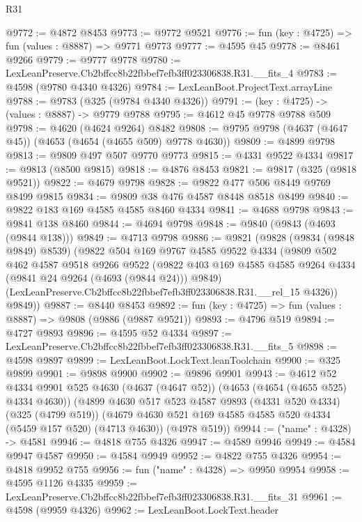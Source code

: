 \begin{lexlean}{R31}
\begin{coremodule}
@9772 := @4872 @8453
@9773 := @9772 @9521
@9776 := fun (key : @4725) => fun (values : @8887) => @9771 @9773
@9777 := @4595 @45
@9778 := @8461 @9266
@9779 := @9777 @9778
@9780 := LexLeanPreserve.Cb2bffcc8b22fbbef7efb3ff023306838.R31.__fits_4
@9783 := @4598 (@9780 @4340 @4326)
@9784 := LexLeanBoot.ProjectText.arrayLine
@9788 := @9783 (@325 (@9784 @4340 @4326))
@9791 := (key : @4725) -> (values : @8887) -> @9779 @9788
@9795 := @4612 @45 @9778 @9788 @509
@9798 := @4620 (@4624 @9264) @8482
@9808 := @9795 @9798 (@4637 (@4647 @45)) (@4653 (@4654 (@4655 @509) @9778 @4630))
@9809 := @4899 @9798
@9813 := @9809 @497 @507 @9770 @9773
@9815 := @4331 @9522 @4334
@9817 := @9813 (@8500 @9815)
@9818 := @4876 @8453
@9821 := @9817 (@325 (@9818 @9521))
@9822 := @4679 @9798
@9828 := @9822 @477 @506 @8449 @9769 @8499 @9815
@9834 := @9809 @38 @476 @4587 @8448 @8518 @8499
@9840 := @9822 @183 @169 @4585 @4585 @8460 @4334
@9841 := @4688 @9798
@9843 := @9841 @138 @8460
@9844 := @4694 @9798
@9848 := @9840 (@9843 (@4693 (@9844 @138)))
@9849 := @4713 @9798
@9886 := @9821
    (@9828
      (@9834 (@9848 @9849) @8539)
      (@9822
        @504
        @169
        @9767
        @4585
        @9522
        @4334
        (@9809
          @502
          @462
          @4587
          @9518
          @9266
          @9522
          (@9822 @403 @169 @4585 @4585 @9264 @4334 (@9841 @24 @9264 (@4693 (@9844 @24))) @9849)
          (LexLeanPreserve.Cb2bffcc8b22fbbef7efb3ff023306838.R31.__rel_15 @4326))
        @9849))
@9887 := @8440 @8453
@9892 := fun (key : @4725) => fun (values : @8887) => @9808 (@9886 (@9887 @9521))
@9893 := @4796 @519
@9894 := @4727 @9893
@9896 := @4595 @52 @4334
@9897 := LexLeanPreserve.Cb2bffcc8b22fbbef7efb3ff023306838.R31.__fits_5
@9898 := @4598 @9897
@9899 := LexLeanBoot.LockText.leanToolchain
@9900 := @325 @9899
@9901 := @9898 @9900
@9902 := @9896 @9901
@9943 := @4612
    @52
    @4334
    @9901
    @525
    @4630
    (@4637 (@4647 @52))
    (@4653 (@4654 (@4655 @525) @4334 @4630))
    (@4899
      @4630
      @517
      @523
      @4587
      @9893
      (@4331 @520 @4334)
      (@325 (@4799 @519))
      (@4679 @4630 @521 @169 @4585 @4585 @520 @4334 (@5459 @157 @520) (@4713 @4630))
      (@4978 @519))
@9944 := ("name" : @4328) -> @4581
@9946 := @4818 @755 @4326
@9947 := @4589 @9946
@9949 := @4584 @9947 @4587
@9950 := @4584 @9949
@9952 := @4822 @755 @4326
@9954 := @4818 @9952 @755
@9956 := fun ("name" : @4328) => @9950 @9954
@9958 := @4595 @1126 @4335
@9959 := LexLeanPreserve.Cb2bffcc8b22fbbef7efb3ff023306838.R31.__fits_31
@9961 := @4598 (@9959 @4326)
@9962 := LexLeanBoot.LockText.header

\end{coremodule}
\end{lexlean}
